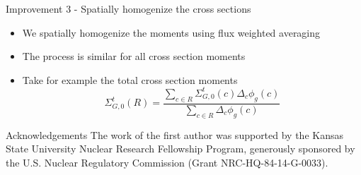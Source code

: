 \documentclass[final]{beamer}
\begin{document}
\begin{frame}{}
\begin{columns}[t]
\begin{column}{0.32\linewidth}
\begin{block}{Improvement 3 - Spatially homogenize the cross sections}
\begin{itemize}
                    \item We spatially homogenize the moments using flux weighted averaging
                    \item The process is similar for all cross section moments
                    \item Take for example the total cross section moments
                    \begin{equation*}
                        \Sigma^t_{G,0}(R) =
                        \frac{\sum\limits_{c\in R}\Sigma^t_{G,0}(c) \Delta_c \phi_{g}(c)}
                        {\sum\limits_{c\in R} \Delta_c \phi_{g}(c)}
                    \end{equation*} 
                \end{itemize}
            \end{block}
            \vspace{0.55eX}
            \begin{block}{Acknowledgements}
                The work of the first author was supported by the Kansas State University Nuclear Research Fellowship Program, generously sponsored by the U.S. Nuclear Regulatory Commission (Grant NRC-HQ-84-14-G-0033).
            \end{block}
            \vspace{0.55eX}
        \end{column}


\end{columns}
\end{frame}
\end{document}
